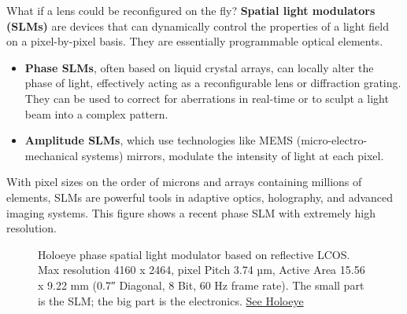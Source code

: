 \documentclass[
  letterpaper,
]{book}
\providecommand{\tightlist}{%
  \setlength{\itemsep}{0pt}\setlength{\parskip}{0pt}}\usepackage{longtable,booktabs,array}
\begin{document}
What if a lens could be reconfigured on the fly? \textbf{Spatial light
modulators (SLMs)} are devices that can dynamically control the
properties of a light field on a pixel-by-pixel basis. They are
essentially programmable optical elements.

\begin{itemize}
\tightlist
\item
  \textbf{Phase SLMs}, often based on liquid crystal arrays, can locally
  alter the phase of light, effectively acting as a reconfigurable lens
  or diffraction grating. They can be used to correct for aberrations in
  real-time or to sculpt a light beam into a complex pattern.
\item
  \textbf{Amplitude SLMs}, which use technologies like MEMS
  (micro-electro-mechanical systems) mirrors, modulate the intensity of
  light at each pixel.
\end{itemize}

With pixel sizes on the order of microns and arrays containing millions
of elements, SLMs are powerful tools in adaptive optics, holography, and
advanced imaging systems. This figure shows a recent phase SLM with
extremely high resolution.

\begin{figure}


\caption{\label{fig-slm-holoeye}Holoeye phase spatial light modulator
based on reflective LCOS. Max resolution 4160 x 2464, pixel Pitch 3.74
µm, Active Area 15.56 x 9.22 mm (0.7″ Diagonal, 8 Bit, 60 Hz frame
rate). The small part is the SLM; the big part is the electronics.
\href{https://holoeye.com/products/spatial-light-modulators/gaea-2-phase-only/}{See
Holoeye}}

\end{figure}%
\end{document}
